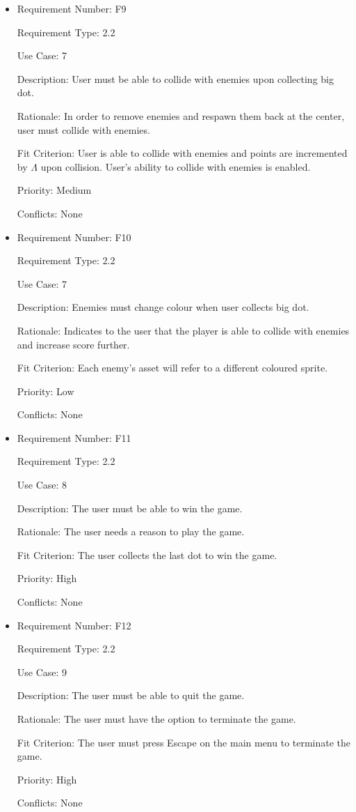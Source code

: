 \documentclass[12pt, titlepage]{article}
\begin{document}
\begin{itemize}
\item
Requirement Number: F9

Requirement Type: 2.2

Use Case: 7

Description: User must be able to collide with enemies upon collecting big dot.

Rationale: In order to remove enemies and respawn them back at the center, user must collide with enemies.

Fit Criterion: User is able to collide with enemies and points are incremented by $\hyperref[tab:constants]{\Lambda}$ upon collision. User's ability to collide with enemies is enabled.

Priority: Medium

Conflicts: None
\end{itemize}

\begin{itemize}
\item
Requirement Number: F10

Requirement Type: 2.2

Use Case: 7

Description: Enemies must change colour when user collects big dot.

Rationale: Indicates to the user that the player is able to collide with enemies and increase score further.

Fit Criterion: Each enemy's asset will refer to a different coloured sprite.

Priority: Low

Conflicts: None
\end{itemize}

\begin{itemize}
\item
Requirement Number: F11

Requirement Type: 2.2

Use Case: 8

Description: The user must be able to win the game.

Rationale: The user needs a reason to play the game.

Fit Criterion: The user collects the last dot to win the game.

Priority: High

Conflicts: None
\end{itemize}

\begin{itemize}
\item
Requirement Number: F12

Requirement Type: 2.2

Use Case: 9

Description: The user must be able to quit the game.

Rationale: The user must have the option to terminate the game.

Fit Criterion: The user must press Escape on the main menu to terminate the game.

Priority: High

Conflicts: None
\end{itemize}
\end{document}
